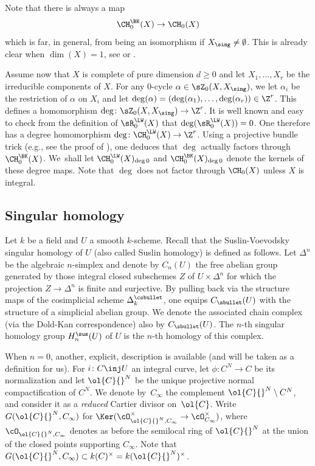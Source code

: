 Note that there is always a map
\begin{equation}\label{eqn:lci-Fulton}
\CH^{\BK}_0(X) \to \CH_0(X)
\end{equation}
which is far, in general, from being an isomorphism if $X_{\sing} \neq
\emptyset$. This is already clear when $\dim (X)=1$, see \cite{LW} or
\cite[Lem.\,3.12]{BK}.

Assume now that $X$ is complete of pure dimension $d \ge 0$ and let
$X_1, \ldots, X_r$ be the irreducible components of $X$. For any
$0$-cycle $\alpha \in \sZ_0(X, X_\sing)$, we let
$\alpha_i$ be the restriction of $\alpha$ on $X_i$ and let
$\deg(\alpha) = (\deg(\alpha_1), \ldots , \deg(\alpha_r)) \in \Z^r$.
This defines a homomorphism
$\deg \colon \sZ_0(X, X_\sing) \to \Z^r$. It is well known and easy to check
from the definition of $\sR^{\LW}_0(X)$ that $\deg(\sR^{\LW}_0(X)) = 0$.
One therefore has a degree homomorphism
$\deg \colon \CH^{\LW}_0(X) \to \Z^r$. Using a projective bundle trick (e.g., see
the proof of ), one deduces that $\deg$ actually factors
through $\CH^{\BK}_0(X)$. We~shall let $\CH^{\LW}_0(X)_{\deg 0}$ and
$\CH^{\BK}_0(X)_{\deg 0}$ denote the kernels of these degree maps.
Note that $\deg$ does not factor through $\CH_0(X)$ unless $X$ is integral.

\subsection{Singular homology}\label{ssec:SuslinHomologydef}
Let $k$ be a field and $U$ a smooth $k$-scheme. Recall that the Suslin-Voevodsky singular homology of $U$ (also called Suslin homology) is defined as follows. Let $\Delta^n$ be the algebraic $n$-simplex and denote by $C_n(U)$ the free abelian group generated by those integral closed subschemes $Z$ of $U\times \Delta^n$ for which the projection $Z\to \Delta^n$ is finite and surjective. By pulling back via the structure maps of the cosimplicial scheme $\Delta^{\csbullet}_k$, one equips $C_\sbullet(U)$ with the structure of a simplicial abelian group. We denote the associated chain complex (via the Dold-Kan correspondence) also by $C_\sbullet(U)$. The $n$-th singular homology
group $H^{\sus}_n(U)$ of $U$ is the $n$-th homology of this complex.

When $n=0$, another, explicit, description is available (and will be taken as a definition for us). For $i\colon C\inj U$ an integral curve, let $\phi\colon C^N\to C$ be its normalization and let $\ol{C}{}^N$ be the unique projective normal
compactification of $C^N$. We denote by~$C_\infty$ the complement $\ol{C}{}^N \setminus C^N$, and consider it as a \emph{reduced} Cartier divisor on~$\ol{C}$. Write $G(\ol{C}{}^N, C_\infty)$ for $\Ker(\cO_{\ol{C}{}^N, C_\infty}^\times \to \cO_{C_\infty}^\times)$, where $\cO_{\ol{C}{}^N, C_\infty}$ denotes as before the semilocal ring of $\ol{C}{}^N$ at the union of the closed points supporting $C_\infty$. Note that $G(\ol{C}{}^N, C_\infty)\subset k(C)^\times = k(\ol{C}{}^N)^\times$.

